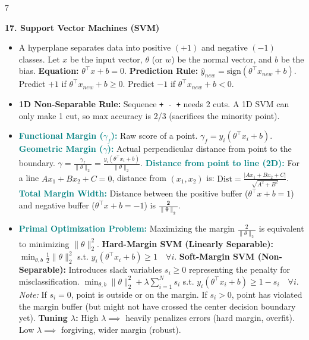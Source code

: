 \documentclass{article}
\newcommand{\hlhighlight}[1]{\par\vspace{1.5pt}\noindent\colorbox{yellow!50}{\parbox{\dimexpr\columnwidth-2\fboxsep\relax}{\textbf{#1}}}\par\vspace{0.5pt}}
\newcommand{\sectitle}[1]{\par\textbf{\color{blue!70!black}{#1}}\par}
\newcommand{\concept}[1]{\textcolor{teal}{\textbf{#1}}}
\newcommand{\lbl}[1]{\textcolor{green!60!black}{\textbf{#1}}}
\begin{document}
\begin{multicols}{7}
\hlhighlight{17. Support Vector Machines (SVM)}
\sectitle{Hyperplane Basics \& Geometry}
\begin{itemize}
    \item A hyperplane separates data into positive $(+1)$ and negative $(-1)$ classes. Let $x$ be the input vector, $\theta$ (or $w$) be the normal vector, and $b$ be the bias. \lbl{Equation:} $\theta^\top x + b = 0$. \lbl{Prediction Rule:} $\hat{y}_{new} = \text{sign}(\theta^\top x_{new} + b)$. Predict $+1$ if $\theta^\top x_{new} + b \ge 0$. Predict $-1$ if $\theta^\top x_{new} + b < 0$.
    \item \lbl{1D Non-Separable Rule:} Sequence \texttt{+ - +} needs 2 cuts. A 1D SVM can only make 1 cut, so max accuracy is 2/3 (sacrifices the minority point).
\end{itemize}
\sectitle{Margins \& Distance Calculation}
\begin{itemize}
    \item \concept{Functional Margin ($\gamma_f$):} Raw score of a point. $\gamma_f = y_i(\theta^\top x_i + b)$. \concept{Geometric Margin ($\gamma$):} Actual perpendicular distance from point to the boundary. $\gamma = \frac{\gamma_f}{\|\theta\|_2} = \frac{y_i(\theta^\top x_i + b)}{\|\theta\|_2}$. \concept{Distance from point to line (2D):} For a line $Ax_1 + Bx_2 + C = 0$, distance from $(x_1, x_2)$ is: $\text{Dist} = \frac{|Ax_1 + Bx_2 + C|}{\sqrt{A^2 + B^2}}$. \concept{Total Margin Width:} Distance between the positive buffer ($\theta^\top x + b = 1$) and negative buffer ($\theta^\top x + b = -1$) is $\mathbf{\frac{2}{\|\theta\|_2}}$.
\end{itemize}
\sectitle{Optimization \& Formulation}
\begin{itemize}
    \item \concept{Primal Optimization Problem:} Maximizing the margin $\frac{2}{\|\theta\|_2}$ is equivalent to minimizing $\|\theta\|_2^2$. \lbl{Hard-Margin SVM (Linearly Separable):} $\min_{\theta, b} \frac{1}{2} \|\theta\|_2^2$ s.t. $y_i(\theta^\top x_i + b) \ge 1 \quad \forall i$. \lbl{Soft-Margin SVM (Non-Separable):} Introduces slack variables $s_i \ge 0$ representing the penalty for misclassification. $\min_{\theta, b} \|\theta\|_2^2 + \lambda \sum_{i=1}^{N} s_i$ s.t. $y_i(\theta^\top x_i + b) \ge 1 - s_i \quad \forall i$. \textit{Note:} If $s_i = 0$, point is outside or on the margin. If $s_i > 0$, point has violated the margin buffer (but might not have crossed the center decision boundary yet). \lbl{Tuning $\lambda$:} High $\lambda \implies$ heavily penalizes errors (hard margin, overfit). Low $\lambda \implies$ forgiving, wider margin (robust).

\end{itemize}
\end{multicols}
\end{document}
